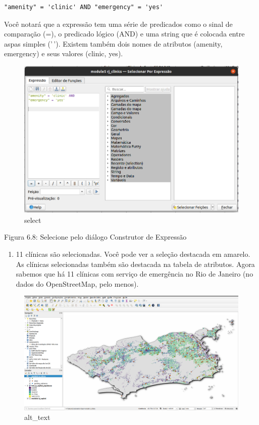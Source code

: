 \documentclass[
]{book}
\providecommand{\tightlist}{%
  \setlength{\itemsep}{0pt}\setlength{\parskip}{0pt}}
\begin{document}
\begin{verbatim}
"amenity" = 'clinic' AND "emergency" = 'yes'
\end{verbatim}

Você notará que a expressão tem uma série de predicados como o sinal de comparação (=), o predicado lógico (AND) e uma string que é colocada entre aspas simples ('\,'). Existem também dois nomes de atributos (amenity, emergency) e seus valores (clinic, yes).

\begin{figure}
\centering
\includegraphics{media/modulo6/select.png}
\caption{select}
\end{figure}

Figura 6.8: Selecione pelo diálogo Construtor de Expressão

\begin{enumerate}
\def\labelenumi{\arabic{enumi}.}
\setcounter{enumi}{2}
\tightlist
\item
  11 clínicas são selecionadas. Você pode ver a seleção destacada em amarelo. As clínicas selecionadas também são destacada na tabela de atributos. Agora sabemos que há 11 clínicas com serviço de emergência no Rio de Janeiro (no dados do OpenStreetMap, pelo menos).
\end{enumerate}

\begin{figure}
\centering
\includegraphics{media/modulo6/selected-canvas.png}
\caption{alt\_text}
\end{figure}
\end{document}
